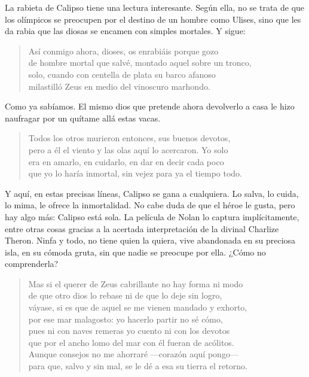 \documentclass[11pt,a4paper]{article}
\begin{document}
La rabieta de Calipso tiene una lectura interesante. Según ella, no se trata de que los olímpicos se preocupen por el destino de un hombre como Ulises, sino que les da rabia que las diosas se encamen con simples mortales. Y sigue:

\begin{verse}
Así conmigo ahora, dioses, os enrabiáis porque gozo\\
de hombre mortal que salvé, montado aquel sobre un tronco,\\
solo, cuando con centella de plata su barco afanoso\\
milastilló Zeus en medio del vinoscuro marhondo.
\end{verse}


Como ya sabíamos. El mismo dios que pretende ahora devolverlo a casa le hizo naufragar por un quítame allá estas vacas.

\begin{verse}
Todos los otros murieron entonces, sus buenos devotos,\\
pero a él el viento y las olas aquí lo acercaron. Yo solo\\
era en amarlo, en cuidarlo, en dar en decir cada poco\\
que yo lo haría inmortal, sin vejez para ya el tiempo todo.
\end{verse}

Y aquí, en estas precisas líneas, Calipso se gana a cualquiera. Lo salva, lo cuida, lo mima, le ofrece la inmortalidad. No cabe duda de que el héroe le gusta, pero hay algo más: Calipso está sola. La película de Nolan lo captura implícitamente, entre otras cosas gracias a la acertada interpretación de la divinal Charlize Theron. Ninfa y todo, no tiene quien la quiera, vive abandonada en su preciosa isla, en su cómoda gruta, sin que nadie se preocupe por ella. ¿Cómo no comprenderla?

\begin{verse}
Mas si el querer de Zeus cabrillante no hay forma ni modo\\
de que otro dios lo rebase ni de que lo deje sin logro,\\
váyase, si es que de aquel se me vienen mandado y exhorto,\\
por ese mar malagosto: yo hacerlo partir no sé cómo,\\
pues ni con naves remeras yo cuento ni con los devotos\\
que por el ancho lomo del mar con él fueran de acólitos.\\
Aunque consejos no me ahorraré ---corazón aquí pongo---\\
para que, salvo y sin mal, se le dé a esa su tierra el retorno.
\end{verse}
\end{document}
